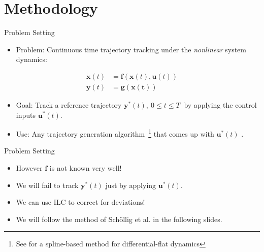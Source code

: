 \documentclass[handout]{beamer}
\newcommand{\state}{\mathbf{x}} %
\newcommand{\traj}{\mathbf{y}^{*}} %
\newcommand{\sysInput}{\mathbf{u}} %
\newcommand{\observations}{\mathbf{y}} %
\begin{document}
\section{Methodology}
%
\begin{frame}{Problem Setting}
\begin{itemize}
\item Problem: Continuous time trajectory tracking under the \emph{nonlinear} system dynamics: \pause
\end{itemize}
\begin{equation*}
\begin{aligned}
\dot{\state}(t) &= \mathbf{f}(\state(t),\sysInput(t)) \\
\observations(t) &= \mathbf{g(x(t))} 
\end{aligned}
\end{equation*}
\begin{itemize}
\item Goal: Track a reference trajectory $\traj(t), \ 0 \leq t \leq T \ $ by applying the control inputs $\sysInput^{*}(t)$. \pause
\item Use: Any trajectory generation algorithm~\footnote{See \cite{Zhang} for a spline-based method for differential-flat dynamics} that comes up with $\sysInput^{*}(t)$ %
.\pause 
\end{itemize}
\end{frame}
%
\begin{frame}{Problem Setting}
\begin{itemize}	
\item However $\mathbf{f}$ is not known very well! \pause
\item We will fail to track $\traj(t)$ just by applying $\sysInput^{*}(t)$. \pause
\item We can use ILC to correct for deviations! \pause
\item We will follow the method of Sch\"{o}llig et al. \cite{ILC_Angela} in the following slides. 
\end{itemize}
\end{frame}
%
\end{document}
